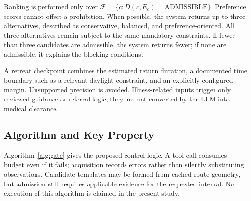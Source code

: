 \documentclass[conference]{IEEEtran}
\begin{document}
Ranking is performed only over $\mathcal F=\{c:D(c,E_c)=\text{ADMISSIBLE}\}$. Preference scores cannot offset a prohibition. When possible, the system returns up to three alternatives, described as conservative, balanced, and preference-oriented. All three alternatives remain subject to the same mandatory constraints. If fewer than three candidates are admissible, the system returns fewer; if none are admissible, it explains the blocking conditions.

A retreat checkpoint combines the estimated return duration, a documented time boundary such as a relevant daylight constraint, and an explicitly configured margin. Unsupported precision is avoided. Illness-related inputs trigger only reviewed guidance or referral logic; they are not converted by the LLM into medical clearance.

\subsection{Algorithm and Key Property}
Algorithm~\ref{alg:gate} gives the proposed control logic. A tool call consumes budget even if it fails; acquisition records errors rather than silently substituting observations. Candidate templates may be formed from cached route geometry, but admission still requires applicable evidence for the requested interval. No execution of this algorithm is claimed in the present study.
\end{document}
